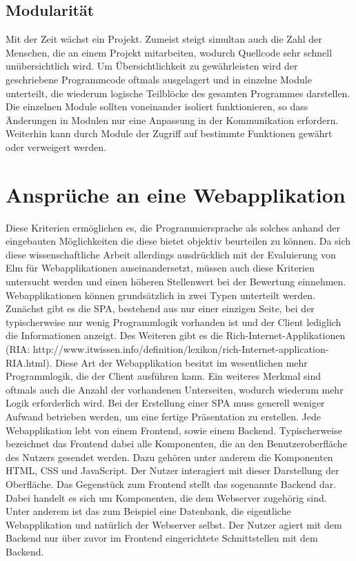 \subsection{Modularität}
\label{sec:Modularität_Analyse}
Mit der Zeit wächst ein Projekt. Zumeist steigt simultan auch die Zahl der Menschen, die an einem Projekt mitarbeiten, wodurch Quellcode sehr schnell unübersichtlich wird. Um Übersichtlichkeit zu gewährleisten wird der geschriebene Programmcode oftmals ausgelagert und in einzelne Module unterteilt, die wiederum logische Teilblöcke des gesamten Programmes darstellen. Die einzelnen Module sollten voneinander isoliert funktionieren, so dass Änderungen in Modulen nur eine Anpassung in der Kommunikation erfordern. Weiterhin kann durch Module der Zugriff auf bestimmte Funktionen gewährt oder verweigert werden.


\section{Ansprüche an eine Webapplikation}
\label{sec:ansprueche-webapp}
Diese Kriterien ermöglichen es, die Programmiersprache als solches anhand der eingebauten Möglichkeiten die diese bietet objektiv beurteilen zu können. Da sich diese wissenschaftliche Arbeit allerdings ausdrücklich mit der Evaluierung von Elm für Webapplikationen auseinandersetzt, müssen auch diese Kriterien untersucht werden und einen höheren Stellenwert bei der Bewertung einnehmen.
Webapplikationen können grundsätzlich in zwei Typen unterteilt werden. Zunächst gibt es die  \ac{SPA}, bestehend aus nur einer einzigen Seite, bei der typischerweise nur wenig  Programmlogik vorhanden ist und der Client lediglich die Informationen anzeigt. Des Weiteren gibt es die Rich-Internet-Applikationen\\
(RIA: http://www.itwissen.info/definition/lexikon/rich-Internet-application-RIA.html). Diese Art der Webapplikation besitzt im wesentlichen mehr Programmlogik, die der Client ausführen kann. Ein weiteres Merkmal sind oftmals auch die Anzahl der vorhandenen Unterseiten, wodurch wiederum mehr Logik erforderlich wird.
Bei der Erstellung einer \ac{SPA} muss generell weniger Aufwand betrieben werden, um eine fertige Präsentation zu erstellen.
Jede Webapplikation lebt von einem Frontend, sowie einem Backend. Typischerweise bezeichnet das Frontend dabei alle Komponenten, die an den Benutzeroberfläche des Nutzers gesendet werden. Dazu gehören unter anderem die Komponenten HTML, CSS und JavaScript. Der Nutzer interagiert mit dieser Darstellung der Oberfläche.
Das Gegenstück zum Frontend stellt das sogenannte Backend dar. Dabei handelt es sich um Komponenten, die dem Webserver zugehörig sind. Unter anderem ist das zum Beispiel eine Datenbank, die eigentliche Webapplikation und natürlich der Webserver selbst. Der Nutzer agiert mit dem Backend nur über zuvor im Frontend eingerichtete Schnittstellen mit dem Backend.


